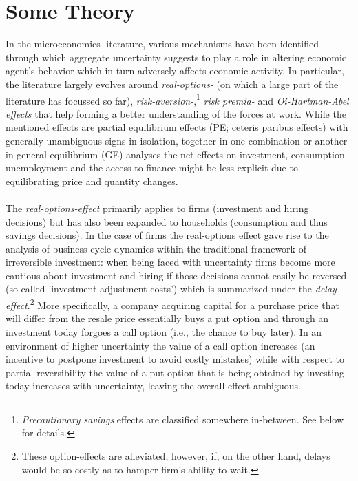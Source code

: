 \documentclass[a4paper,11pt,listof=nochaptergap,oneside,pointednumbers,bibtotoc,bigheadings,liststotoc]{scrbook}
\begin{document}
\section{Some Theory}

In the microeconomics literature, various mechanisms have been identified through which aggregate uncertainty suggests to play a role in altering economic agent's behavior which in turn adversely affects economic activity. In particular, the literature largely evolves around \textit{real-options-} (on which a large part of the literature has focussed so far), \textit{risk-aversion-},\footnote{\textit{Precautionary savings} effects are classified somewhere in-between. See below for details.} \textit{risk premia-} and \textit{Oi-Hartman-Abel effects} that help forming a better understanding of the forces at work. While the mentioned effects are partial equilibrium effects (PE; ceteris paribus effects) with generally unambiguous signs in isolation, together in one combination or another in general equilibrium (GE) analyses the net effects on investment, consumption unemployment and the access to finance might be less explicit due to equilibrating price and quantity changes.\\
\\
The \textit{real-options-effect} primarily applies to firms (investment and hiring decisions) but has also been expanded to households (consumption and thus savings decisions). In the case of firms the real-options effect gave rise to the analysis of business cycle dynamics within the traditional framework of irreversible investment: when being faced with uncertainty firms become more cautious about investment and hiring if those decisions cannot easily be reversed (so-called 'investment adjustment costs') which is summarized under the \textit{delay effect}.\footnote{These option-effects are alleviated, however, if, on the other hand, delays would be so costly as to hamper firm's ability to wait.} More specifically, a company acquiring capital for a purchase price that will differ from the resale price essentially buys a put option and through an investment today forgoes a call option (i.e., the chance to buy later). In an environment of higher uncertainty the value of a call option increases (an incentive to postpone investment to avoid costly mistakes) while with respect to partial reversibility the value of a put option that is being obtained by investing today increases with uncertainty, leaving the overall effect ambiguous. \\
\end{document}
